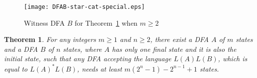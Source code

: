 \documentclass[10pt]{article}
\newtheorem{theorem}{Theorem}
\begin{document}
\begin{figure}[ht]
  \begin{center}
  \texttt{[image: DFAB-star-cat-special.eps]}
  \end{center}
  \caption{Witness DFA $B$ for Theorem~\ref{thm:star-cat-lower-special} when $m \ge 2$}
\label{fig:DFAB-star-cat-special}
\end{figure}

\begin{theorem}\label{thm:star-cat-lower-special}
For any integers $m \ge 1$ and $n \ge 2$, there exist a DFA $A$ of $m$ states and a DFA $B$ of $n$ states, where $A$ has only one final state and it is also the initial state, such that any DFA accepting the language $L(A)L(B)$, which is equal to $L(A)^*L(B)$, needs at least $m(2^n-1) - 2^{n-1} + 1$ states.
\end{theorem}
\end{document}
